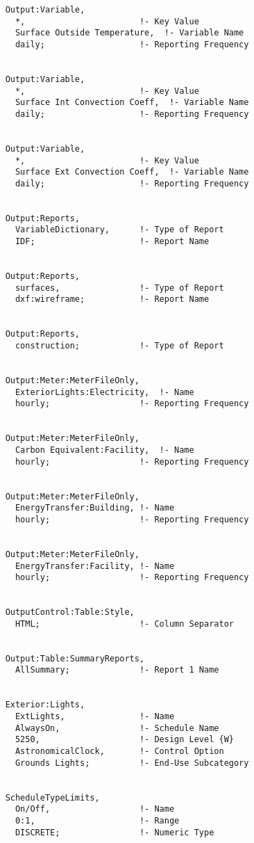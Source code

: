 \begin{lstlisting}
    Output:Variable,
      *,                       !- Key Value
      Surface Outside Temperature,  !- Variable Name
      daily;                   !- Reporting Frequency


    Output:Variable,
      *,                       !- Key Value
      Surface Int Convection Coeff,  !- Variable Name
      daily;                   !- Reporting Frequency


    Output:Variable,
      *,                       !- Key Value
      Surface Ext Convection Coeff,  !- Variable Name
      daily;                   !- Reporting Frequency


    Output:Reports,
      VariableDictionary,      !- Type of Report
      IDF;                     !- Report Name


    Output:Reports,
      surfaces,                !- Type of Report
      dxf:wireframe;           !- Report Name


    Output:Reports,
      construction;            !- Type of Report


    Output:Meter:MeterFileOnly,
      ExteriorLights:Electricity,  !- Name
      hourly;                  !- Reporting Frequency


    Output:Meter:MeterFileOnly,
      Carbon Equivalent:Facility,  !- Name
      hourly;                  !- Reporting Frequency


    Output:Meter:MeterFileOnly,
      EnergyTransfer:Building, !- Name
      hourly;                  !- Reporting Frequency


    Output:Meter:MeterFileOnly,
      EnergyTransfer:Facility, !- Name
      hourly;                  !- Reporting Frequency


    OutputControl:Table:Style,
      HTML;                    !- Column Separator


    Output:Table:SummaryReports,
      AllSummary;              !- Report 1 Name


    Exterior:Lights,
      ExtLights,               !- Name
      AlwaysOn,                !- Schedule Name
      5250,                    !- Design Level {W}
      AstronomicalClock,       !- Control Option
      Grounds Lights;          !- End-Use Subcategory


    ScheduleTypeLimits,
      On/Off,                  !- Name
      0:1,                     !- Range
      DISCRETE;                !- Numeric Type



\end{lstlisting}
